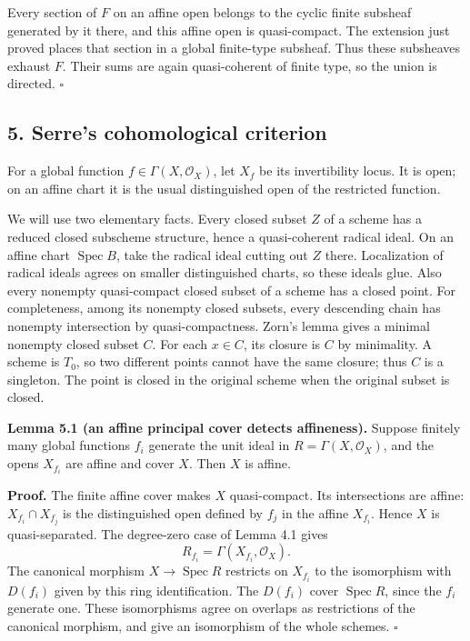 \documentclass[11pt]{article}
\begin{document}
Every section of \(F\) on an affine open belongs to the cyclic finite
subsheaf generated by it there, and this affine open is quasi-compact.
The extension just proved places that section in a global finite-type
subsheaf. Thus these subsheaves exhaust \(F\). Their sums are again
quasi-coherent of finite type, so the union is directed. \(\square\)

\subsection{5. Serre's cohomological
criterion}\label{serres-cohomological-criterion}

For a global function \(f\in\Gamma(X,\mathcal O_X)\), let \(X_f\) be its
invertibility locus. It is open; on an affine chart it is the usual
distinguished open of the restricted function.

We will use two elementary facts. Every closed subset \(Z\) of a scheme
has a reduced closed subscheme structure, hence a quasi-coherent radical
ideal. On an affine chart \(\operatorname{Spec}B\), take the radical
ideal cutting out \(Z\) there. Localization of radical ideals agrees on
smaller distinguished charts, so these ideals glue. Also every nonempty
quasi-compact closed subset of a scheme has a closed point. For
completeness, among its nonempty closed subsets, every descending chain
has nonempty intersection by quasi-compactness. Zorn's lemma gives a
minimal nonempty closed subset \(C\). For each \(x\in C\), its closure
is \(C\) by minimality. A scheme is \(T_0\), so two different points
cannot have the same closure; thus \(C\) is a singleton. The point is
closed in the original scheme when the original subset is closed.

\textbf{Lemma 5.1 (an affine principal cover detects affineness).}
Suppose finitely many global functions \(f_i\) generate the unit ideal
in \(R=\Gamma(X,\mathcal O_X)\), and the opens \(X_{f_i}\) are affine
and cover \(X\). Then \(X\) is affine.

\textbf{Proof.} The finite affine cover makes \(X\) quasi-compact. Its
intersections are affine: \(X_{f_i}\cap X_{f_j}\) is the distinguished
open defined by \(f_j\) in the affine \(X_{f_i}\). Hence \(X\) is
quasi-separated. The degree-zero case of Lemma 4.1 gives \[
R_{f_i}=\Gamma(X_{f_i},\mathcal O_X).
\] The canonical morphism \(X\to\operatorname{Spec}R\) restricts on
\(X_{f_i}\) to the isomorphism with \(D(f_i)\) given by this ring
identification. The \(D(f_i)\) cover \(\operatorname{Spec}R\), since the
\(f_i\) generate one. These isomorphisms agree on overlaps as
restrictions of the canonical morphism, and give an isomorphism of the
whole schemes. \(\square\)
\end{document}
